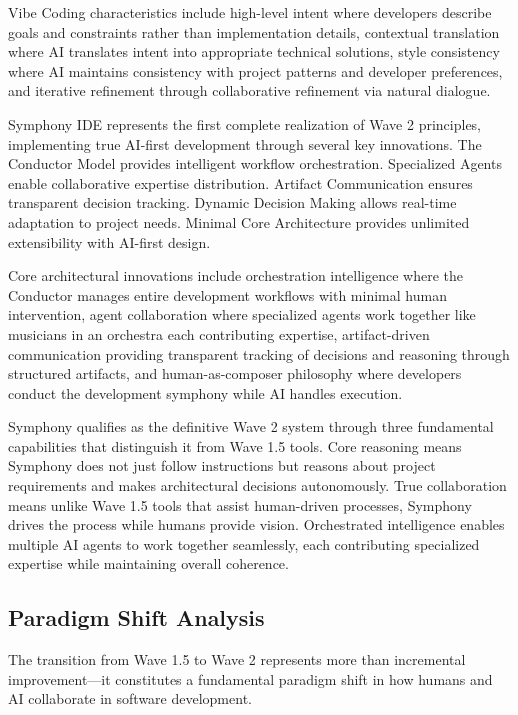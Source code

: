 Vibe Coding characteristics include high-level intent where developers describe goals and constraints rather than implementation details, contextual translation where AI translates intent into appropriate technical solutions, style consistency where AI maintains consistency with project patterns and developer preferences, and iterative refinement through collaborative refinement via natural dialogue.

Symphony IDE represents the first complete realization of Wave 2 principles, implementing true AI-first development through several key innovations. The Conductor Model provides intelligent workflow orchestration. Specialized Agents enable collaborative expertise distribution. Artifact Communication ensures transparent decision tracking. Dynamic Decision Making allows real-time adaptation to project needs. Minimal Core Architecture provides unlimited extensibility with AI-first design.

Core architectural innovations include orchestration intelligence where the Conductor manages entire development workflows with minimal human intervention, agent collaboration where specialized agents work together like musicians in an orchestra each contributing expertise, artifact-driven communication providing transparent tracking of decisions and reasoning through structured artifacts, and human-as-composer philosophy where developers conduct the development symphony while AI handles execution.

Symphony qualifies as the definitive Wave 2 system through three fundamental capabilities that distinguish it from Wave 1.5 tools. Core reasoning means Symphony does not just follow instructions but reasons about project requirements and makes architectural decisions autonomously. True collaboration means unlike Wave 1.5 tools that assist human-driven processes, Symphony drives the process while humans provide vision. Orchestrated intelligence enables multiple AI agents to work together seamlessly, each contributing specialized expertise while maintaining overall coherence.

\subsection{Paradigm Shift Analysis}

The transition from Wave 1.5 to Wave 2 represents more than incremental improvement—it constitutes a fundamental paradigm shift in how humans and AI collaborate in software development.


